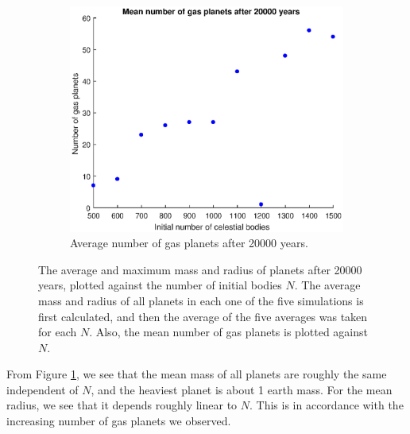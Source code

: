 \begin{figure}[H]
	\begin{subfigure}{0.5\textwidth}
	\includegraphics[width=\textwidth]{AantalGasPlaneten.eps}
	\caption{Average number of gas planets after 20000 years.}
	\end{subfigure}
	\caption{The average and maximum mass and radius of planets after 20000 years, plotted against the number of initial bodies $N$. The average mass and radius of all planets in each one of the five simulations is first calculated, and then the average of the five averages was taken for each $N$. Also, the mean number of gas planets is plotted against $N$.}
	\label{AverageMassandRadiusEnGasNieuw}
\end{figure} 
From Figure \ref{AverageMassandRadiusEnGasNieuw}, we see that the mean mass of all planets are roughly the same independent of $N$, and the heaviest planet is about 1 earth mass. For the mean radius, we see that it depends roughly linear to $N$. This is in accordance with the increasing number of gas planets we observed.